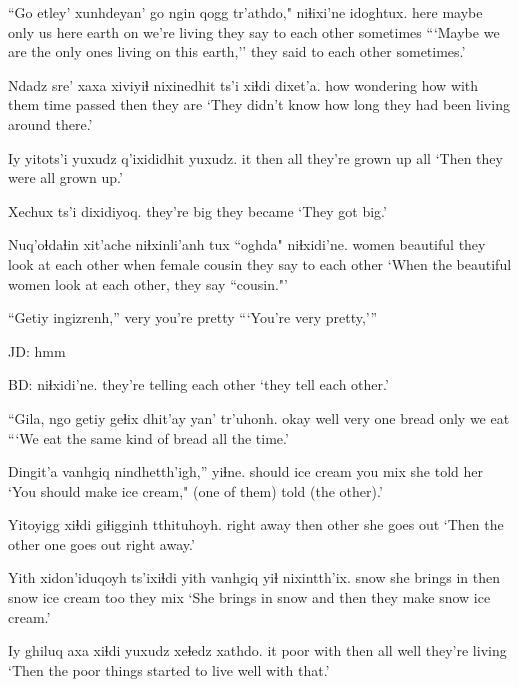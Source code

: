 \documentclass[12pt]{article}
\begin{document}
\gll ``Go   etley' xunhdeyan' go   ngin  qogg tr'athdo,"   niɬixi'ne              idoghtux.
 here maybe   {only us}  here earth on   {we're living} {they say to each other} sometimes
\glt ```Maybe we are the only ones living on this earth,'' they said to each other sometimes.'
\glend

\gll Ndadz sre' xaxa xiviyiɬ   nixinedhit  {ts'i xiɬdi} dixet'a. 
how wondering how {with them} {time passed}      then   {they are}
\glt `They didn't know how long they had been living around there.'
\glend

\gll Iy yitots'i yuxudz q'ixididhit      yuxudz.
it then     all    {they're grown up } all
\glt `Then they were all grown up.'
\glend

\gll Xechux      ts'i dixidiyoq.
{they're big}  {}    {they became}
\glt `They got big.'
\glend

\gll Nuq'oɬdaɬin xit'ache niɬxinli'anh           tux  ``oghda" niɬxidi'ne.
women       beautiful {they look at each other} when {female cousin}  {they say to each other}
\glt `When the beautiful women look at each other, they say ``cousin."'
\glend

\gll ``Getiy ingizrenh,''
very  {you're pretty}
\glt ```You're very pretty,'''
\glend

JD:  hmm

BD:  
\gll niɬxidi'ne.
{{they're telling each other}}
\glt `they tell each other.'
\glend

\gll ``Gila, ngo getiy geɬix dhit'ay yan' tr'uhonh.
okay well very one   bread   only {we eat}
\glt ```We eat the same kind of bread all the time.'
\glend

\gll Dingit'a vanhgiq   nindhetth'igh,'' yiɬne.
should   {ice cream} {you mix}         {she told her}
\glt `You should make ice cream," (one of them) told (the other).'
\glend

\gll Yitoyigg xiɬdi giɬigginh tthituhoyh.
{right away}      then  other     {she goes out}
\glt `Then the other one goes out right away.'
\glend

\gll Yith xidon'iduqoyh ts'ixiɬdi yith vanhgiq   yiɬ nixintth'ix.
snow {she brings in} then  snow {ice cream} too {they mix}
\glt `She brings in snow and then they make snow ice cream.'
\glend

\gll Iy ghiluq axa xiɬdi yuxudz xeɬedz xathdo.
it poor   with then all    well   {they're living}
\glt `Then the poor things started to live well with that.'
\glend
\end{document}
